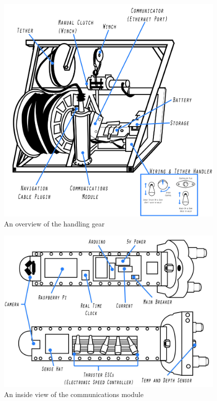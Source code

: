 \documentclass[
10pt, %
a4paper, %
oneside, %
headinclude,footinclude, %
BCOR5mm, %
]{scrartcl}
\begin{document}
\begin{figure}[H]
	\centering 
	\includegraphics[width=0.9\columnwidth]{Figures/Component_Diagrams/handling_gear.jpg}
	\caption[]{An overview of the handling gear} %
\end{figure}
\begin{figure}[H]
	\centering 
	\includegraphics[width=0.9\columnwidth]{Figures/Component_Diagrams/navigation_board.jpg}
	\caption[]{An inside view of the communications module} %
\end{figure}
\clearpage
\newpage
\end{document}

